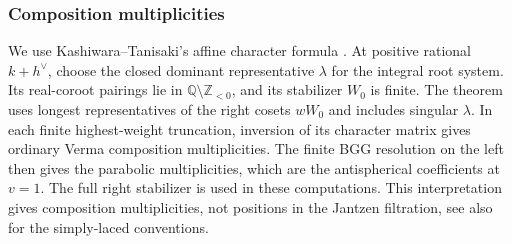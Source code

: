 \documentclass[11pt,a4paper]{amsart}
\numberwithin{equation}{section}
\theoremstyle{definition}
\theoremstyle{remark}
\begin{document}
\subsubsection{Composition multiplicities}\label{com:hecke-multiplicities}
We use Kashiwara--Tanisaki's affine character formula
\cite[Theorem~1.4]{KT}. At positive rational $k+h^\vee$, choose the
closed dominant representative $\lambda$ for the integral root system.
Its real-coroot pairings lie in $\mathbb Q\setminus\mathbb Z_{<0}$,
and its stabilizer $W_0$ is finite. The theorem uses longest representatives
of the right cosets $wW_0$ and includes singular $\lambda$.
In each finite highest-weight truncation, inversion of its character
matrix gives ordinary Verma composition multiplicities. The finite BGG
resolution on the left then gives the parabolic multiplicities, which
are the antispherical coefficients at $v=1$. The full right
stabilizer is used in these computations. This interpretation gives composition
multiplicities, not positions in the Jantzen filtration, see also
\cite[\S6.1]{JiangSong2025} for the simply-laced conventions.
\end{document}
